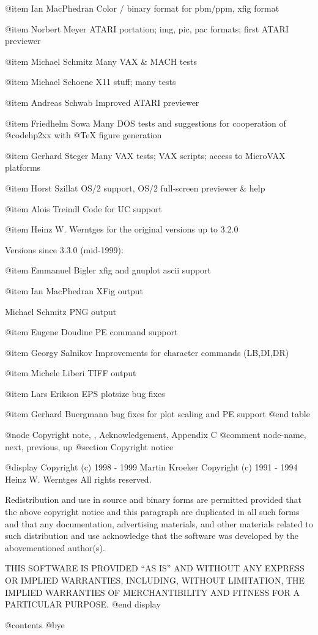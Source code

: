 @item Ian MacPhedran
Color / binary format for pbm/ppm, xfig format

@item Norbert Meyer
ATARI portation; img, pic, pac formats; first ATARI previewer

@item Michael Schmitz
Many VAX & MACH tests

@item Michael Schoene
X11 stuff; many tests

@item Andreas Schwab
Improved ATARI previewer

@item Friedhelm Sowa
Many DOS tests and suggestions for cooperation of @code{hp2xx} with
@TeX{} figure generation

@item Gerhard Steger
Many VAX tests; VAX scripts; access to MicroVAX platforms

@item Horst Szillat
OS/2 support, OS/2 full-screen previewer & help

@item Alois Treindl
Code for UC support

@item Heinz W. Werntges 
for the original versions up to 3.2.0


Versions since 3.3.0 (mid-1999):

@item Emmanuel Bigler
xfig and gnuplot ascii support

@item Ian MacPhedran
XFig output

Michael Schmitz
PNG output

@item Eugene Doudine
PE command support

@item Georgy Salnikov 
Improvements for character commands (LB,DI,DR)

@item Michele Liberi
TIFF output

@item Lars Erikson
EPS plotsize bug fixes

@item Gerhard Buergmann
bug fixes for plot scaling and PE support
@end table



@node Copyright note, , Acknowledgement, Appendix C
@comment  node-name,  next,  previous,  up
@section Copyright notice

@display
Copyright (c) 1998 - 1999  Martin Kroeker
Copyright (c) 1991 - 1994  Heinz W. Werntges
All rights reserved.

Redistribution and use in source and binary forms are permitted provided that
the above copyright notice and this paragraph are duplicated in all such forms
and that any documentation, advertising materials, and other materials related
to such distribution and use acknowledge that the software was developed
by the abovementioned author(s).

THIS SOFTWARE IS PROVIDED ``AS IS'' AND WITHOUT ANY EXPRESS
OR IMPLIED WARRANTIES, INCLUDING, WITHOUT LIMITATION,
THE IMPLIED WARRANTIES OF MERCHANTIBILITY AND FITNESS
FOR A PARTICULAR PURPOSE.
@end display

@contents
@bye

